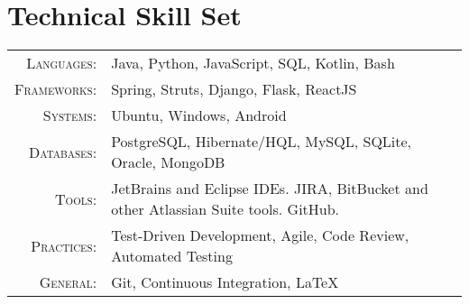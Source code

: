 \section{Technical Skill Set}

\begin{tabular}{r|p{11cm}}
	\textsc{Languages}: & Java, Python, JavaScript, SQL, Kotlin, Bash \\
	\textsc{Frameworks}: & Spring, Struts, Django, Flask, ReactJS \\
	\textsc{Systems}: & Ubuntu, Windows, Android \\
	\textsc{Databases}: & PostgreSQL, Hibernate/HQL, MySQL, SQLite, Oracle, MongoDB \\
	\textsc{Tools}: & JetBrains and Eclipse IDEs. JIRA, BitBucket and other Atlassian Suite tools. GitHub. \\
	\textsc{Practices}: & Test-Driven Development, Agile, Code Review, Automated Testing \\
	\textsc{General}: & Git, Continuous Integration, LaTeX \\
\end{tabular}
